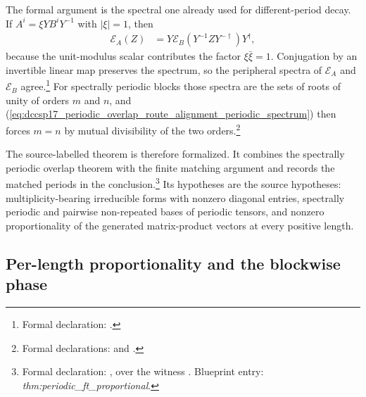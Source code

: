 \documentclass{article}
\begin{document}
The formal argument is the spectral one already used for different-period
decay. If $A^i=\xi YB^iY^{-1}$ with $|\xi|=1$, then
\begin{align}
    \mathcal E_A(Z)
    &=Y\mathcal E_B\!\left(Y^{-1}ZY^{-\dagger}\right)Y^\dagger,
    \label{eq:dccsp17_periodic_overlap_route_alignment_repeated_transfer_congruence}
\end{align}
because the unit-modulus scalar contributes the factor $\xi\bar\xi=1$.
Conjugation by an invertible linear map preserves the spectrum, so the
peripheral spectra of $\mathcal E_A$ and $\mathcal E_B$ agree.\footnote{Formal
declaration:
.} For
spectrally periodic blocks those spectra are the sets of roots of unity of
orders $m$ and $n$, and
(\ref{eq:dccsp17_periodic_overlap_route_alignment_periodic_spectrum}) then
forces $m=n$ by mutual divisibility of the two orders.\footnote{Formal
declarations:  and
.}

The source-labelled theorem is therefore formalized. It combines the
spectrally periodic overlap theorem with the finite matching argument and
records the matched periods in the conclusion.\footnote{Formal declaration:
,
over the witness . Blueprint
entry: \emph{thm:periodic\_ft\_proportional}.} Its hypotheses are the source
hypotheses: multiplicity-bearing irreducible forms with nonzero diagonal
entries, spectrally periodic and pairwise non-repeated bases of periodic
tensors, and nonzero proportionality of the generated matrix-product vectors
at every positive length.

\subsection{Per-length proportionality and the blockwise phase}
\end{document}
